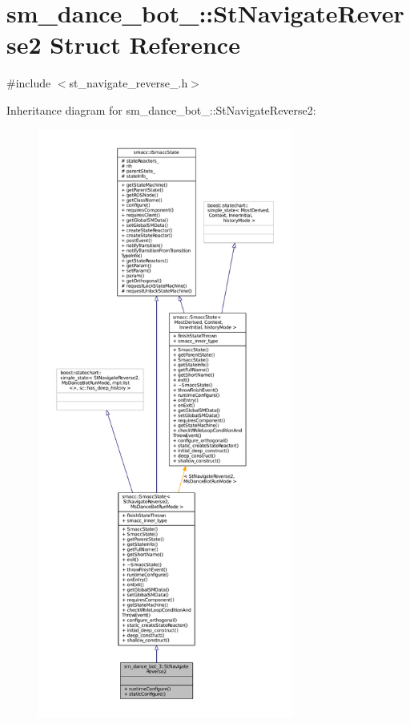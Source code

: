 \hypertarget{structsm__dance__bot__3_1_1StNavigateReverse2}{}\section{sm\+\_\+dance\+\_\+bot\+\_\+:\+:St\+Navigate\+Reverse2 Struct Reference}
\label{structsm__dance__bot__3_1_1StNavigateReverse2}


{\ttfamily \#include $<$st\+\_\+navigate\+\_\+reverse\+\_.\+h$>$}



Inheritance diagram for sm\+\_\+dance\+\_\+bot\+\_\+:\+:St\+Navigate\+Reverse2\+:
\nopagebreak
\begin{figure}[H]
\begin{center}
\leavevmode
\includegraphics[height=550pt]{structsm__dance__bot__3_1_1StNavigateReverse2__inherit__graph}
\end{center}
\end{figure}


